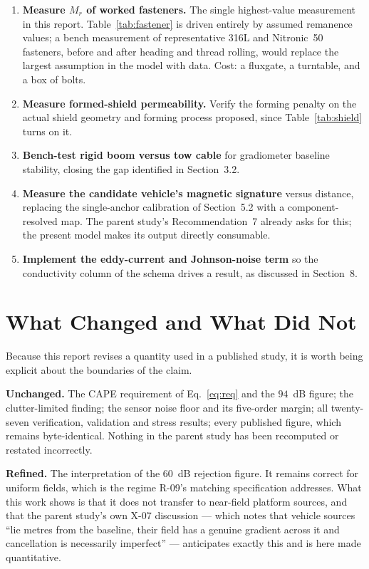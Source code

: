 \documentclass[11pt]{article}
\begin{document}
\begin{enumerate}[leftmargin=1.5em]
\item \textbf{Measure $M_r$ of worked fasteners.} The single highest-value
measurement in this report. Table~\ref{tab:fastener} is driven entirely by
assumed remanence values; a bench measurement of representative 316L and
Nitronic~50 fasteners, before and after heading and thread rolling, would replace
the largest assumption in the model with data. Cost: a fluxgate, a turntable, and
a box of bolts.
\item \textbf{Measure formed-shield permeability.} Verify the
\cite{gohil2020} forming penalty on the actual shield geometry and forming
process proposed, since Table~\ref{tab:shield} turns on it.
\item \textbf{Bench-test rigid boom versus tow cable} for gradiometer baseline
stability, closing the gap identified in Section~3.2.
\item \textbf{Measure the candidate vehicle's magnetic signature} versus
distance, replacing the single-anchor calibration of Section~5.2 with a
component-resolved map. The parent study's Recommendation~7 already asks for
this; the present model makes its output directly consumable.
\item \textbf{Implement the eddy-current and Johnson-noise term} so the
conductivity column of the schema drives a result, as discussed in Section~8.
\end{enumerate}

\section{What Changed and What Did Not}
Because this report revises a quantity used in a published study, it is worth
being explicit about the boundaries of the claim.

\textbf{Unchanged.} The CAPE requirement of Eq.~\eqref{eq:req} and the $94$~dB
figure; the clutter-limited finding; the sensor noise floor and its five-order
margin; all twenty-seven verification, validation and stress results; every
published figure, which remains byte-identical. Nothing in the parent study has
been recomputed or restated incorrectly.

\textbf{Refined.} The interpretation of the $60$~dB rejection figure. It remains
correct for uniform fields, which is the regime R-09's matching specification
addresses. What this work shows is that it does not transfer to near-field
platform sources, and that the parent study's own X-07 discussion --- which notes
that vehicle sources ``lie metres from the baseline, their field has a genuine
gradient across it and cancellation is necessarily imperfect'' --- anticipates
exactly this and is here made quantitative.
\end{document}

